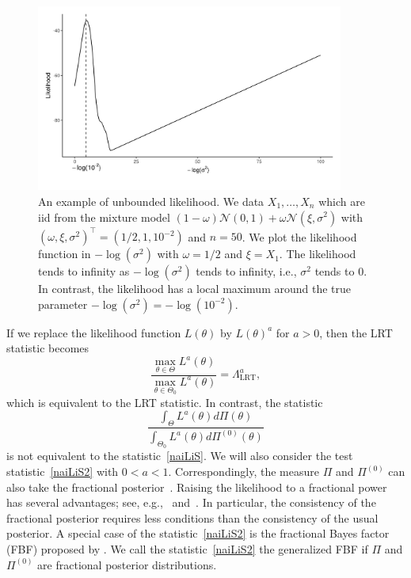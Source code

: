 \documentclass[11pt]{article}
\theoremstyle{plain}
\theoremstyle{definition}
\theoremstyle{remark}
\begin{document}
\begin{figure}
    \begin{center}
        \includegraphics[width=0.9\textwidth]{figure/newnewPP}
    \end{center}
    \caption{
        An example of unbounded likelihood.
        We data $X_1,\ldots,X_n$ which are iid from the mixture model $(1-\omega)\mathcal{N}(0,1)+\omega\mathcal{N}(\xi,\sigma^2)$ with $(\omega,\xi,\sigma^2)^\top =(1/2,1,10^{-2})$ and $n=50$.
        We plot the likelihood function  in $-\log (\sigma^2)$ with $\omega=1/2$ and $\xi=X_1$.
        The likelihood tends to infinity as $-\log (\sigma^2)$ tends to infinity, i.e., $\sigma^2$ tends to $0$.
        In contrast, the likelihood has a local maximum around the true parameter $-\log (\sigma^{2})=-\log (10^{-2})$.
    }
    \label{myFigure1}
\end{figure}



If we replace the likelihood function $L(\theta)$ by $L(\theta)^a$ for $a>0$, then the LRT statistic becomes
\begin{equation*}
    \frac{\max_{\theta\in\Theta}L^{a}(\theta)}{\max_{\theta\in\Theta_0}L^a(\theta)}=\Lambda^a_{\text{LRT}},
\end{equation*}
which is equivalent to the LRT statistic.
In contrast, the statistic
\begin{equation}\label{naiLiS2}
\frac{\int_{\Theta}L^a(\theta) d\Pi(\theta)}{\int_{\Theta_0} L^a(\theta) d\Pi^{(0)}(\theta)}
\end{equation}
is not equivalent to the statistic~\eqref{naiLiS}.
We will also consider the test statistic~\eqref{naiLiS2} with $0<a<1$.
Correspondingly, the measure $\Pi$ and $\Pi^{(0)}$ can also take the fractional posterior~\citep{Bha2016}.
Raising the likelihood to a fractional power has several advantages; see, e.g.,~\cite{kar10563} and~\cite{Bha2016}.
In particular, the consistency of the fractional posterior requires less conditions than the consistency of the usual posterior.
A special case of the statistic~\eqref{naiLiS2} is the fractional Bayes factor (FBF) proposed by \cite{Fractional1995}.
We call the statistic~\eqref{naiLiS2} the generalized FBF if $\Pi$ and $\Pi^{(0)}$ are fractional posterior distributions.
\end{document}
